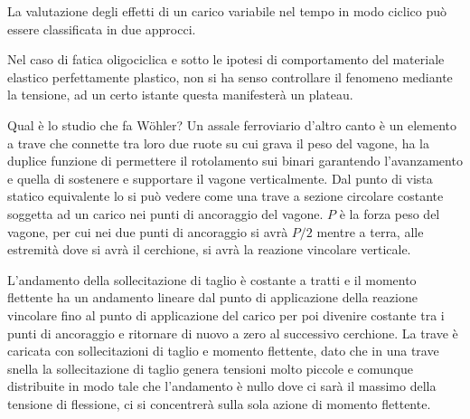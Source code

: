 \documentclass{article}
\begin{document}
\begin{adjustwidth}{2in}{}
		La valutazione degli effetti di un carico variabile nel tempo in modo ciclico  può essere classificata in due approcci. \newline
		
	

		Nel caso di fatica oligociclica e sotto le ipotesi di comportamento del materiale elastico perfettamente plastico, non si ha senso controllare il fenomeno mediante la tensione, ad un certo istante questa manifesterà un plateau. \newline
		
		Qual è lo studio che fa Wöhler? Un assale ferroviario d'altro canto è un elemento a trave che connette tra loro due ruote su cui grava il peso del vagone, ha la duplice funzione di permettere il rotolamento sui binari garantendo l'avanzamento e quella di sostenere e supportare il vagone verticalmente. Dal punto di vista statico equivalente lo si può vedere come una trave a sezione circolare costante soggetta ad un carico nei punti di ancoraggio del vagone. $P$ è la forza peso del vagone, per cui nei due punti di ancoraggio si avrà $P/2$ mentre a terra, alle estremità dove si avrà il cerchione, si avrà la reazione vincolare verticale.
		
		L'andamento della sollecitazione di taglio è costante a tratti e il momento flettente ha un andamento lineare dal punto di applicazione della reazione vincolare fino al punto di applicazione del carico per poi divenire costante tra i punti di ancoraggio e ritornare di nuovo a zero al successivo cerchione. La trave è caricata con sollecitazioni di taglio e momento flettente, dato che in una trave snella la sollecitazione di taglio genera tensioni molto piccole e comunque distribuite in modo tale che l'andamento è nullo dove ci sarà il massimo della tensione di flessione, ci si concentrerà sulla sola azione di momento flettente. 
		
		 \end{adjustwidth}
\end{document}

